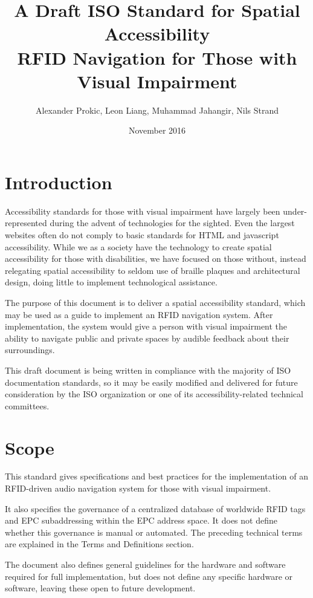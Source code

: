 \documentclass{article}
\title{A Draft ISO Standard for Spatial Accessibility \\
\large RFID Navigation for Those with Visual Impairment   
}
\author{Alexander Prokic, Leon Liang, Muhammad Jahangir, Nils Strand}
\date{November 2016}
\begin{document}
\maketitle

\section*{Introduction}

Accessibility standards for those with visual impairment have largely been under-represented during the advent of technologies for the sighted. Even the largest websites often do not comply to basic standards for HTML and javascript accessibility. While we as a society have the technology to create spatial accessibility for those with disabilities, we have focused on those without, instead relegating spatial accessibility to seldom use of braille plaques and architectural design, doing little to implement technological assistance. \medskip

The purpose of this document is to deliver a spatial accessibility standard, which may be used as a guide to implement an RFID navigation system. After implementation, the system would give a person with visual impairment the ability to navigate public and private spaces by audible feedback about their surroundings. \medskip

This draft document is being written in compliance with the majority of ISO documentation standards, so it may be easily modified and delivered for future consideration by the ISO organization or one of its accessibility-related technical committees.

\section{Scope}

This standard gives specifications and best practices for the implementation of an RFID-driven audio navigation system for those with visual impairment. \medskip

It also specifies the governance of a centralized database of worldwide RFID tags and EPC subaddressing within the EPC address space. It does not define whether this governance is manual or automated. The preceding technical terms are explained in the Terms and Definitions section. \medskip

The document also defines general guidelines for the hardware and software required for full implementation, but does not define any specific hardware or software, leaving these open to future development. \medskip
\end{document}
